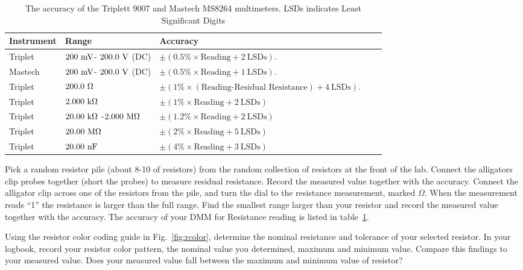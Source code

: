 \begin{table}[h!]
\normalsize %
\begin{tabular}{ lllll }
\hline
\textbf{Instrument} &\textbf{Range} & \textbf{Accuracy}  \\
\hline
Triplet & $200~\rm mV$- $200.0~\rm V$ (DC) & $\pm (0.5\% \times \mbox{Reading}+ 2~\mbox{LSDs})$. \\
\hline
Mastech & $200~\rm mV$- $200.0~\rm V$ (DC) & $\pm (0.5\% \times \mbox{Reading}+ 1~\mbox{LSDs})$. \\
\hline
Triplet & $200.0~\rm \Omega$ & $\pm (1\% \times (\mbox{Reading-Residual Resistance} )+ 4~\mbox{LSDs})$. \\
\hline
Triplet & $2.000~\rm k\Omega$ & $\pm (1\% \times \mbox{Reading} + 2~\mbox{LSDs})$  \\
\hline
Triplet & $20.00~\rm k\Omega$ -$2.000~\rm M\Omega$ & $\pm (1.2\% \times \mbox{Reading} + 2~\mbox{LSDs})$  \\
\hline
Triplet & $20.00~\rm M\Omega$ & $\pm (2\% \times \mbox{Reading} + 5~\mbox{LSDs})$  \\
\hline
Triplet & $20.00~\rm nF$ & $\pm (4\% \times \mbox{Reading} + 3~\mbox{LSDs})$  \\
\hline
\end{tabular} 
\caption{The accuracy of the Triplett 9007 and Mastech MS8264 multimeters. LSDs indicates Least Significant Digits}
\label{tbl:accuracy}
\end{table}


\begin{measurement} Pick a random resistor pile (about 8-10 of resistors) from the random collection of resistors at the front of the lab.  Connect the alligators clip probes  together (short the probes) to measure residual resistance. Record the measured value together with the accuracy. Connect the alligator clip across one of the resistors from the pile, and turn the dial to the resistance measurement, marked $\Omega$.  When the measurement reads ``1'' the resistance is larger
than the full range.  Find the smallest range larger than your resistor and record the measured value together with the accuracy. The accuracy of your DMM for Resistance reading is listed in table~\ref{tbl:accuracy}. 

Using the resistor color coding guide in Fig.~\ref{fig:rcolor}, determine the nominal resistance and tolerance of your selected resistor.  In your logbook, record your resistor color pattern, the nominal value you determined, maximum and minimum value. Compare this findings to your measured value. Does your measured value fall between the maximum and minimum value of resistor?
\end{measurement}

